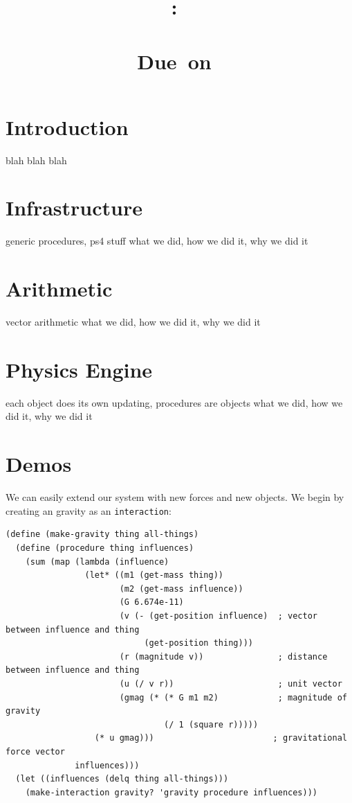 \documentclass{article}
\title{
    \textmd{\hmwkClass:\ \hmwkTitle}\\
    \\
    \small{Due\ on\ \hmwkDueDate}
}
\author{\hmwkAuthorName}
\date{}
\begin{document}
\maketitle
\section{Introduction}
blah blah blah

\section{Infrastructure}
generic procedures, ps4 stuff
what we did, how we did it, why we did it

\section{Arithmetic}
vector arithmetic
what we did, how we did it, why we did it

\section{Physics Engine}
each object does its own updating, procedures are objects
what we did, how we did it, why we did it

\section{Demos}
We can easily extend our system with new forces and new objects. We begin by creating an gravity as an \texttt{interaction}:

{\small\begin{verbatim}
(define (make-gravity thing all-things)
  (define (procedure thing influences)
    (sum (map (lambda (influence)
                (let* ((m1 (get-mass thing))
                       (m2 (get-mass influence))
                       (G 6.674e-11)
                       (v (- (get-position influence)  ; vector between influence and thing
                            (get-position thing)))
                       (r (magnitude v))               ; distance between influence and thing
                       (u (/ v r))                     ; unit vector
                       (gmag (* (* G m1 m2)            ; magnitude of gravity
                                (/ 1 (square r)))))
                  (* u gmag)))                        ; gravitational force vector
              influences)))
  (let ((influences (delq thing all-things)))
    (make-interaction gravity? 'gravity procedure influences)))
\end{verbatim}}
\end{document}
